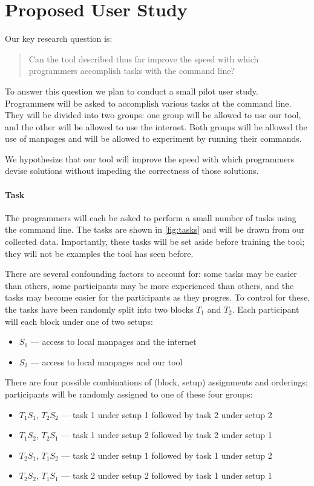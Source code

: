 \section{Proposed User Study}
Our key research question is:
%
\begin{quote}
    Can the tool described thus far improve the speed with which programmers
    accomplish tasks with the command line?
\end{quote}
%
To answer this question we plan to conduct a small pilot user study. Programmers
will be asked to accomplish various tasks at the command line. They will be
divided into two groups: one group will be allowed to use our tool, and the
other will be allowed to use the internet. Both groups will be allowed the use
of manpages and will be allowed to experiment by running their commands.

We hypothesize that our tool will improve the speed with which programmers
devise solutions without impeding the correctness of those solutions.

\paragraph{Task} The programmers will each be asked to perform a small number of
tasks using the command line. The tasks are shown in \autoref{fig:tasks} and
will be drawn from our collected data. Importantly, these tasks will be set
aside before training the tool; they will not be examples the tool has seen
before.

There are several confounding factors to account for: some tasks may be easier
than others, some participants may be more experienced than others, and the
tasks may become easier for the participants as they progres. To control for
these, the tasks have been randomly split into two blocks $T_1$ and $T_2$.
Each participant will each block under one of two setups:
\begin{itemize}
    \item $S_1$ --- access to local manpages and the internet
    \item $S_2$ --- access to local manpages and our tool
\end{itemize}

There are four possible combinations of (block, setup) assignments and
orderings; participants will be randomly assigned to one of these four groups:
\begin{itemize}
    \item $T_1 S_1$, $T_2 S_2$ --- task 1 under setup 1 followed by task 2 under setup 2
    \item $T_1 S_2$, $T_2 S_1$ --- task 1 under setup 2 followed by task 2 under setup 1
    \item $T_2 S_1$, $T_1 S_2$ --- task 2 under setup 1 followed by task 1 under setup 2
    \item $T_2 S_2$, $T_1 S_1$ --- task 2 under setup 2 followed by task 1 under setup 1
\end{itemize}

